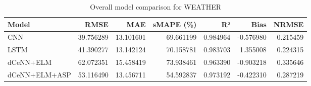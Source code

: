 \begin{table}
\caption{Overall model comparison for WEATHER}
\begin{tabular}{lrrrrrr}
\toprule
Model & RMSE & MAE & sMAPE (\%) & R² & Bias & NRMSE \\
\midrule
CNN & 39.756289 & 13.101601 & 69.661199 & 0.984964 & -0.576980 & 0.215459 \\
LSTM & 41.390277 & 13.142124 & 70.158781 & 0.983703 & 1.355008 & 0.224315 \\
dCeNN+ELM & 62.072351 & 15.458419 & 73.938461 & 0.963390 & -0.903218 & 0.335646 \\
dCeNN+ELM+ASP & 53.116490 & 13.456711 & 54.592837 & 0.973192 & -0.422310 & 0.287219 \\
\bottomrule
\end{tabular}
\end{table}
